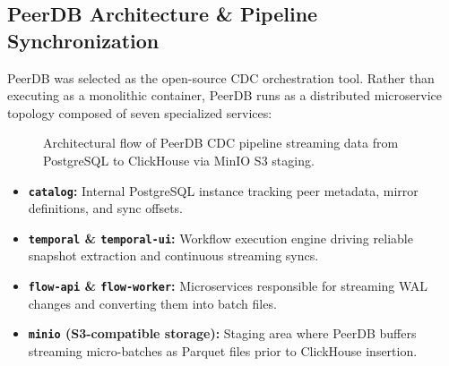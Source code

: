 \documentclass[peerreviewca]{IEEEtran}
\begin{document}
\subsection{PeerDB Architecture \& Pipeline Synchronization}
PeerDB was selected as the open-source CDC orchestration tool. Rather than executing as a monolithic container, PeerDB runs as a distributed microservice topology composed of seven specialized services:

\begin{figure}[htbp]
\centering
{}
\caption{Architectural flow of PeerDB CDC pipeline streaming data from PostgreSQL to ClickHouse via MinIO S3 staging.}
\label{fig:peerdb_arch}
\end{figure}

\begin{itemize}
    \item \textbf{\texttt{catalog}:} Internal PostgreSQL instance tracking peer metadata, mirror definitions, and sync offsets.
    \item \textbf{\texttt{temporal} \& \texttt{temporal-ui}:} Workflow execution engine driving reliable snapshot extraction and continuous streaming syncs.
    \item \textbf{\texttt{flow-api} \& \texttt{flow-worker}:} Microservices responsible for streaming WAL changes and converting them into batch files.
    \item \textbf{\texttt{minio} (S3-compatible storage):} Staging area where PeerDB buffers streaming micro-batches as Parquet files prior to ClickHouse insertion.
\end{itemize}
\end{document}
